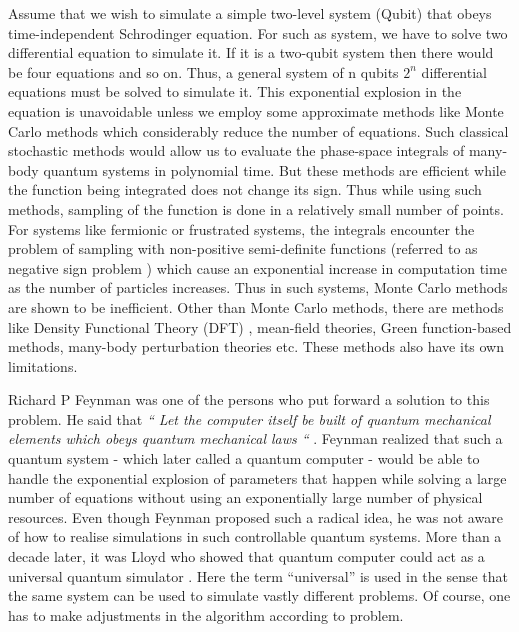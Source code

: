 \documentclass[12pt,a4paper]{report}
\begin{document}
Assume that we wish to simulate a simple two-level system (Qubit) that obeys time-independent Schrodinger equation. For such as system, we have to solve two differential equation to simulate it. If it is a two-qubit system then there would be four equations and so on. Thus, a general system of n qubits $2^{n}$ differential equations must be solved to simulate it. This exponential explosion in the equation is unavoidable unless we employ some approximate methods like Monte Carlo methods \cite{monte} which considerably reduce the number of equations. Such classical stochastic methods would allow us to evaluate the phase-space integrals of many-body quantum systems in polynomial time. But these methods are efficient while the function being integrated does not change its sign. Thus while using such methods, sampling of the function is done in a relatively small number of points. For systems like fermionic or frustrated systems, the integrals encounter the problem of sampling with non-positive semi-definite functions (referred to as negative sign problem \cite{troyer}\cite{georgescu}) which cause an exponential increase in computation time as the number of particles increases. Thus in such systems, Monte Carlo methods are shown to be inefficient. Other than Monte Carlo methods, there are methods like Density Functional Theory (DFT) \cite{dft}, mean-field theories, Green function-based methods, many-body perturbation theories \cite{mbpt} etc. These methods also have its own limitations.

Richard P Feynman was one of the persons who put forward a solution to this problem. He said that \emph{“ Let the computer itself be built of quantum mechanical elements which obeys quantum mechanical laws “} \cite{feynman82}. Feynman realized that such a quantum system - which later called a quantum computer - would be able to handle the exponential explosion of parameters that happen while solving a large number of equations without using an exponentially large number of physical resources. Even though Feynman proposed such a radical idea, he was not aware of how to realise simulations in such controllable quantum systems. More than a decade later, it was Lloyd who showed that quantum computer could act as a universal quantum simulator \cite{lloyd}. Here the term “universal” is used in the sense that the same system can be used to simulate vastly different problems. Of course, one has to make adjustments in the algorithm according to problem. 
\end{document}
